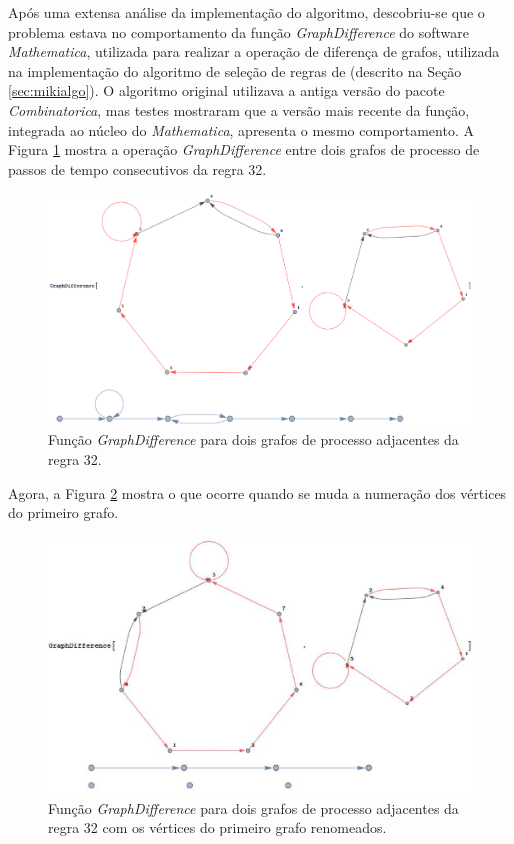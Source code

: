 \documentclass[12pt,a4paper]{article}
\begin{document}
Após uma extensa análise da implementação do algoritmo, descobriu-se que o
problema estava no comportamento da função \textit{GraphDifference} do
software \textit{Mathematica}, utilizada para realizar a operação de
diferença de grafos, utilizada na implementação do algoritmo de seleção de regras de
 (descrito na Seção \ref{sec:mikialgo}).
O algoritmo original utilizava a antiga versão do pacote
\textit{Combinatorica}, mas testes mostraram que a versão mais recente da
função, integrada ao núcleo do \textit{Mathematica}, apresenta o mesmo
comportamento. A Figura \ref{fig:gd1} mostra a operação
\textit{GraphDifference} entre dois grafos de processo de passos de tempo
consecutivos da regra 32.

\begin{figure}[htp]
\begin{center}
\includegraphics[scale=0.35]{img/GraphDifference1.eps}
\caption{Função \textit{GraphDifference} para dois grafos de processo
adjacentes da regra 32.}
\label{fig:gd1}
\end{center}
\end{figure}

Agora, a Figura \ref{fig:gd2} mostra o que ocorre quando se muda a numeração
dos vértices do primeiro grafo.

\begin{figure}[htp]
\begin{center}
\includegraphics[scale=0.4]{img/GraphDifference2.eps}
\caption{Função \textit{GraphDifference} para dois grafos de processo
adjacentes da regra 32 com os vértices do primeiro grafo renomeados.}
\label{fig:gd2}
\end{center}
\end{figure}
\end{document}

